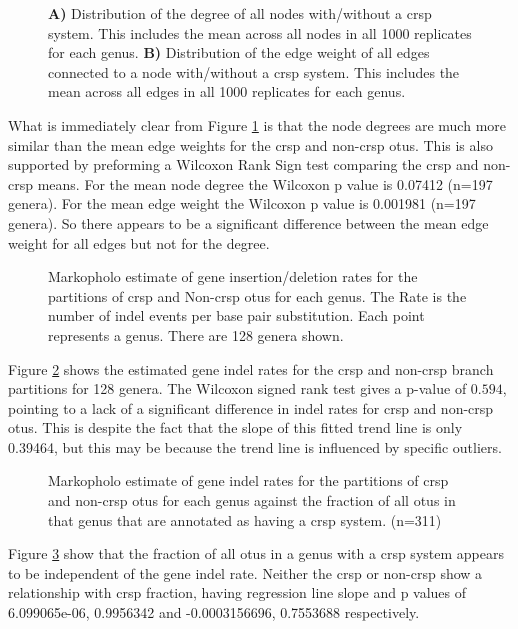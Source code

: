 \FloatBarrier
\begin{figure}[htb!]
    \caption{\textbf{A)} Distribution of the degree of all nodes with/without a \ac{crsp} system. This includes the mean across all nodes in all 1000 replicates for each genus.
             \textbf{B)}  Distribution of the edge weight of all edges connected to a node with/without a \ac{crsp} system. This includes the mean across all edges in all 1000 replicates for each genus.}
    \label{degplot}
\end{figure}
\FloatBarrier
What is immediately clear from Figure \ref{degplot} is that the node degrees are much more similar than the mean edge weights for the \ac{crsp} and non-\ac{crsp} \ac{otu}s.
This is also supported by preforming a Wilcoxon Rank Sign test comparing the \ac{crsp} and non-\ac{crsp} means.
For the mean node degree the Wilcoxon p value is 0.07412 (n=197 genera).
For the mean edge weight the Wilcoxon p value is 0.001981 (n=197 genera).
So there appears to be a significant difference between the mean edge weight for all edges but not for the degree.


\FloatBarrier
\begin{figure}[htb!]
    \caption{Markopholo estimate of gene insertion/deletion rates for the partitions of \ac{crsp} and Non-\ac{crsp} \ac{otu}s for each genus. The Rate is the number of indel events per base pair substitution. Each point represents a genus. There are 128 genera shown.}
    \label{is}
\end{figure}
\FloatBarrier
Figure \ref{is} shows the estimated gene indel rates for the \ac{crsp} and non-\ac{crsp} branch partitions for 128 genera.
The Wilcoxon signed rank test gives a p-value of $0.594$, pointing to a lack of a significant difference in indel rates for \ac{crsp} and non-\ac{crsp} \ac{otu}s.
This is despite the fact that the slope of this fitted trend line is only 0.39464, but this may be because the trend line is influenced by specific outliers.

\FloatBarrier
\begin{figure}[htb!]
    \caption{Markopholo estimate of gene indel rates for the partitions of \ac{crsp} and non-\ac{crsp} \ac{otu}s for each genus against the fraction of all \ac{otu}s in that genus that are annotated as having a \ac{crsp} system. (n=311)}
    \label{cfrd}
\end{figure}
\FloatBarrier
Figure \ref{cfrd} show that the fraction of all \ac{otu}s in a genus with a \ac{crsp} system appears to be independent of the gene indel rate.
Neither the \ac{crsp} or non-\ac{crsp} show a relationship with \ac{crsp} fraction, having regression line slope and p values of 6.099065e-06, 0.9956342 and -0.0003156696, 0.7553688 respectively.


